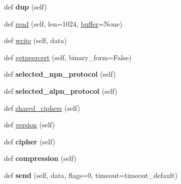 \begin{DoxyCompactItemize}
\mbox{\label{classgevent_1_1__ssl3_1_1_s_s_l_socket_add7ac066af42da452c18a0357c80b6b9}} 
def {\bfseries dup} (self)
\item 
def \hyperlink{classgevent_1_1__ssl3_1_1_s_s_l_socket_aac03dec1f89aded382df4440f5c3d646}{read} (self, len=1024, \hyperlink{structbuffer}{buffer}=None)
\item 
def \hyperlink{classgevent_1_1__ssl3_1_1_s_s_l_socket_a200a4e1f5db77b2c6d67b6a97186b1a6}{write} (self, data)
\item 
def \hyperlink{classgevent_1_1__ssl3_1_1_s_s_l_socket_a6df3214312f129e952b5ca4e171653ab}{getpeercert} (self, binary\+\_\+form=False)
\item 
\mbox{\label{classgevent_1_1__ssl3_1_1_s_s_l_socket_ada906c502392d02d77202d124abb7739}} 
def {\bfseries selected\+\_\+npn\+\_\+protocol} (self)
\item 
\mbox{\label{classgevent_1_1__ssl3_1_1_s_s_l_socket_acb3c8176c5cd350f15ae070916838845}} 
def {\bfseries selected\+\_\+alpn\+\_\+protocol} (self)
\item 
def \hyperlink{classgevent_1_1__ssl3_1_1_s_s_l_socket_a30fd5079ec79337882629034e775be5d}{shared\+\_\+ciphers} (self)
\item 
def \hyperlink{classgevent_1_1__ssl3_1_1_s_s_l_socket_ace26ef6392770a2b4e60cabeb22b89f3}{version} (self)
\item 
\mbox{\label{classgevent_1_1__ssl3_1_1_s_s_l_socket_a63ecf0dadf831885310eaf418b9429a2}} 
def {\bfseries cipher} (self)
\item 
\mbox{\label{classgevent_1_1__ssl3_1_1_s_s_l_socket_a35428c6633c3d5ee86a4d074e7ce7149}} 
def {\bfseries compression} (self)
\item 
\mbox{\label{classgevent_1_1__ssl3_1_1_s_s_l_socket_a3daf0827c9e57eb1c18ac8a36479b535}} 
def {\bfseries send} (self, data, flags=0, timeout=timeout\+\_\+default)
\item 
\mbox{\label{classgevent_1_1__ssl3_1_1_s_s_l_socket_acae067cb849cce1ebce47b9946277b6d}} 

\end{DoxyCompactItemize}
